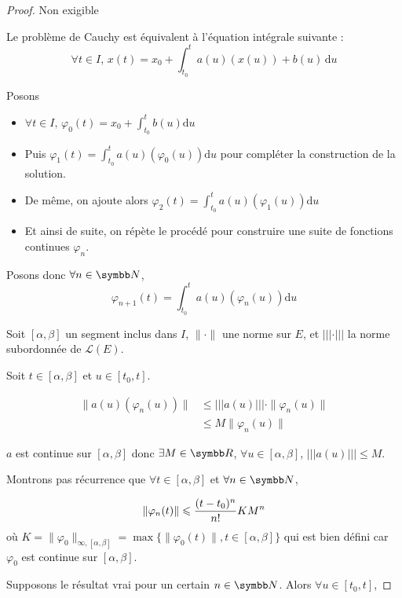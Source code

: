 \begin{proof} Non exigible 


    Le problème de Cauchy est équivalent à l'équation intégrale suivante :
    $$\forall t \in I, \, x(t) = x_0 + \int_{t_0}^{t} a(u)(x(u)) + b(u) \, \mathrm d u$$

    Posons
    \begin{itemize}
        \item $\forall t \in I, \, \varphi_0(t) = x_0 + \int_{t_0}^{t} b(u) \mathrm d u$
        \item Puis $\varphi_1(t) = \int_{t_0}^{t} a(u)(\varphi_0(u)) \mathrm d u$ pour compléter la construction de la solution.
        \item De même, on ajoute alors $\varphi_2(t) = \int_{t_0}^{t} a(u)(\varphi_1(u)) \mathrm d u$
        \item Et ainsi de suite, on répète le procédé pour construire une suite de fonctions continues $\varphi_n$.
    \end{itemize} 
    Posons donc $\forall n \in \N$, $$\varphi_{n + 1}(t) = \int_{t_0}^{t} a(u)(\varphi_n(u)) \mathrm d u$$

    Soit $[\alpha, \beta]$ un segment inclus dans $I$, $\| \cdot \|$ une norme sur $E$, et 
    $||| \cdot |||$ la norme subordonnée de $\mathscr L(E)$.

    Soit $t \in [\alpha, \beta]$ et $u \in [t_0, t]$. 

    \begin{align}
        \| a(u)(\varphi_n(u)) \| & \leqslant ||| a(u) ||| \cdot \| \varphi_n(u) \| \\
        & \leqslant M \| \varphi_n(u) \|
    \end{align}

    $a$ est continue sur $[\alpha, \beta]$ donc $\exists M \in \R$, $\forall u \in [\alpha, \beta]$, 
    $||| a(u) ||| \leqslant M$.

    Montrons pas récurrence que $\forall t \in [\alpha, \beta]$ et $\forall n \in \N$, 

    $$\displaystyle \| \varphi_n(t) \| \leqslant \frac{(t - t_0)^n}{n!} K M^n$$
    où $K = \| \varphi_0 \|_{\infty, [\alpha, \beta]} = \max \{ \| \varphi_0(t) \|, t \in [\alpha, \beta] \}$ qui
    est bien défini car $\varphi_0$ est continue sur $[\alpha, \beta]$.

    Supposons le résultat vrai pour un certain $n \in \N$. Alors 
    $\forall u \in [t_0, t]$, 


\end{proof}
